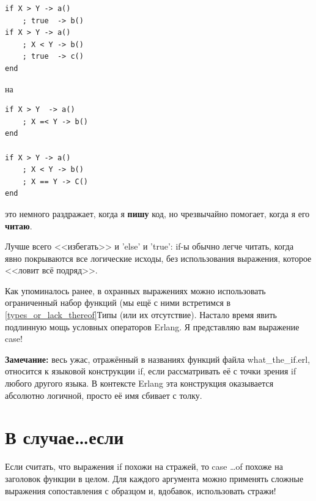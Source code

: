 \documentclass[a4paper,12pt]{report}
\newcommand{\ops}{\colorbox{lgreen}}
\begin{document}
\begin{lstlisting}[style=erlang]
if X > Y -> a()
    ; true  -> b()
if X > Y -> a()
    ; X < Y -> b()
    ; true  -> c()
end
\end{lstlisting}
\colorbox{lgray}
{
    \begin{minipage}{\linewidth}
на
    \end{minipage}
}
\begin{lstlisting}[style=erlang]     
if X > Y  -> a()
    ; X =< Y -> b()
end

if X > Y -> a()
    ; X < Y -> b()
    ; X == Y -> C()
end
\end{lstlisting}
\colorbox{lgray}
{
    \begin{minipage}{\linewidth}
это немного раздражает, когда я \textbf{пишу} код, но чрезвычайно помогает, когда я его \textbf{читаю}.
    \end{minipage}
}

Лучше всего <<избегать>> и 'else' и 'true': \ops{if}\--ы обычно легче читать, когда явно покрываются все логические исходы, без использования выражения, которое <<ловит всё подряд>>.

Как упоминалось ранее, в охранных выражениях можно использовать ограниченный набор функций (мы ещё с ними встретимся в \ref{types_or_lack_thereof}{Типы (или их отсутствие)}. Настало время явить подлинную мощь условных операторов Erlang. Я представляю вам выражение \ops{case}!\\
\colorbox{lgray}
{
    \begin{minipage}{\linewidth}
\textbf{Замечание:} весь ужас, отражённый в названиях функций файла \ops{what\_the\_if.erl}, относится к языковой конструкции \ops{if}, если рассматривать её с точки зрения \ops{if} любого другого языка. В контексте Erlang эта конструкция оказывается абсолютно логичной, просто её имя сбивает с толку.
    \end{minipage}
}
\section{В случае\ldots если}

Если считать, что выражения \ops{if} похожи на стражей, то \ops{case \ldots of} похоже на заголовок функции в целом. Для каждого аргумента можно применять сложные выражения сопоставления с образцом и, вдобавок, использовать стражи!
\end{document}
